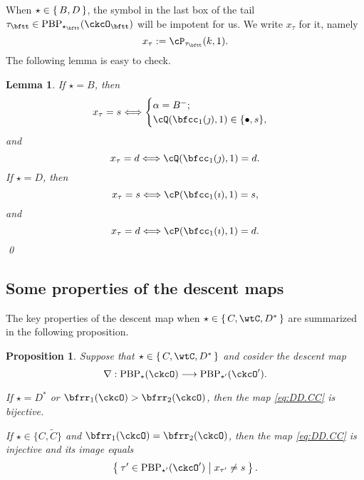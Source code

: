 \documentclass[12pt,a4paper]{amsart}
\numberwithin{equation}{section}
\newtheorem{lem}[thm]{Lemma}
\newtheorem{prop}[thm]{Proposition}
\theoremstyle{remark}
\def\ckcOp{\ckcO^{\prime}}
\def\PBP{\mathrm{PBP}}
\begin{document}
 When $\star \in \set{B,D}$, the symbol in the last box of the tail $\tau_\bftt\in \PBP_{\star_\bftt}(\ckcO_\bftt)$ will be impotent for us. We write $x_\tau$ for it, namely
\[
x_\tau := \cP_{\tau_\bftt}(k,1).
\]
 The following lemma is easy to check.

\begin{lem}\label{tailtip}
If $\star=B$, then
\[
x_\tau=s\Longleftrightarrow
\begin{cases}
  \alpha=B^-;\\
  \cQ(\bfcc_{1}(\jmath),1) \in\{\bullet, s\},
  \end{cases}
\]
and
\[
x_\tau=d \Longleftrightarrow
\cQ(\bfcc_{1}(\jmath),1) =d.
\]
If $\star=D$, then
\[
x_\tau=s\Longleftrightarrow \cP(\bfcc_{1}(\imath),1) = s,
\]
and
\[
x_\tau=d\Longleftrightarrow \cP(\bfcc_{1}(\imath),1) =d.
\]
\qed
\end{lem}







\subsection{Some properties of the descent maps}





The key properties of the descent map when $\star\in \set{C,\wtC,D^*}$ are summarized in the following proposition.

\begin{prop}\label{prop:CC.bij}
Suppose that $\star \in \set{C,\wtC,D^*}$ and cosider the
descent map
\begin{equation}\label{eq:DD.CC}
\nabla: \PBP_\star(\ckcO)\longrightarrow  \PBP_{\star'}(\ckcOp).
\end{equation}
\begin{enuma}
\item If
$\star=D^*$ or $\bfrr_1(\ckcO)>\bfrr_2(\ckcO)$, then
the map \eqref{eq:DD.CC}  is bijective.

\item If  $\star\in \{C,\widetilde C\}$ and $\bfrr_1(\ckcO)=\bfrr_2(\ckcO)$, then the  map \eqref{eq:DD.CC} is injective and its image equals
\[
\Set{\tau'\in \PBP_{\star'}(\ckcOp)| x_{\tau'}\neq s}.
\]
\end{enuma}
\end{prop}
\end{document}

